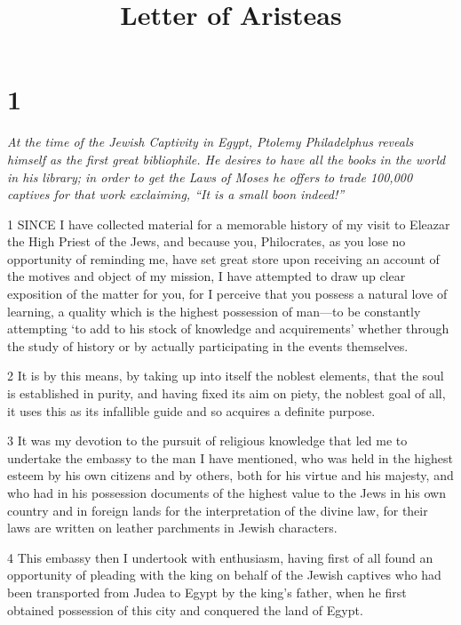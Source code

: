 

\title{Letter of Aristeas}

\chapter{1}

\par \textit{At the time of the Jewish Captivity in Egypt, Ptolemy Philadelphus reveals himself as the first great bibliophile. He desires to have all the books in the world in his library; in order to get the Laws of Moses he offers to trade 100,000 captives for that work exclaiming, “It is a small boon indeed!”}

\par 1 SINCE I have collected material for a memorable history of my visit to Eleazar the High Priest of the Jews, and because you, Philocrates, as you lose no opportunity of reminding me, have set great store upon receiving an account of the motives and object of my mission, I have attempted to draw up clear exposition of the matter for you, for I perceive that you possess a natural love of learning, a quality which is the highest possession of man—to be constantly attempting ‘to add to his stock of knowledge and acquirements’ whether through the study of history or by actually participating in the events themselves.

\par 2 It is by this means, by taking up into itself the noblest elements, that the soul is established in purity, and having fixed its aim on piety, the noblest goal of all, it uses this as its infallible guide and so acquires a definite purpose.

\par 3 It was my devotion to the pursuit of religious knowledge that led me to undertake the embassy to the man I have mentioned, who was held in the highest esteem by his own citizens and by others, both for his virtue and his majesty, and who had in his possession documents of the highest value to the Jews in his own country and in foreign lands for the interpretation of the divine law, for their laws are written on leather parchments in Jewish characters.

\par 4 This embassy then I undertook with enthusiasm, having first of all found an opportunity of pleading with the king on behalf of the Jewish captives who had been transported from Judea to Egypt by the king's father, when he first obtained possession of this city and conquered the land of Egypt.

